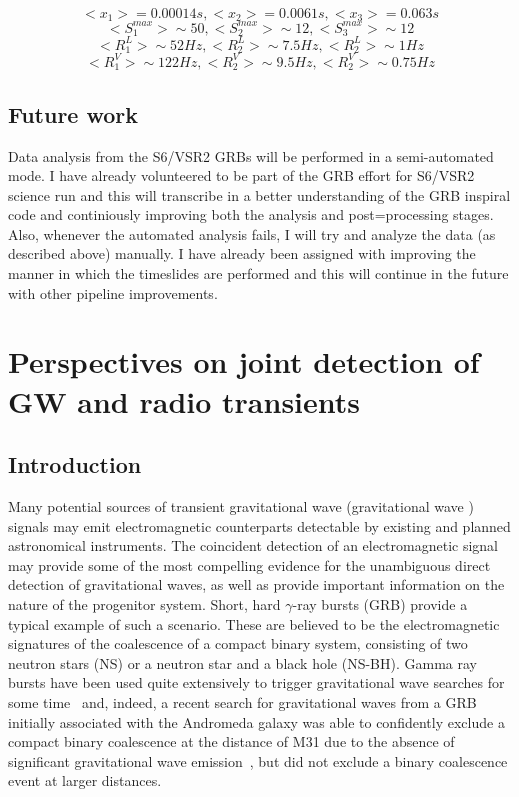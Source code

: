 \documentclass[epsf]{article}
\newcommand{\gw}{gravitational wave }
\newcommand{\gws}{gravitational waves }
\begin{document}
\begin{equation}
<x_1> = 0.00014 s, <x_2> = 0.0061 s, <x_3> = 0.063 s
\label{xs}
\end{equation}
\begin{equation}
<S^{max}_1> \sim 50, <S^{max}_2> \sim 12, <S^{max}_3> \sim 12
\end{equation}
\begin{equation}
<R^L_1> \sim 52 Hz, <R^L_2> \sim 7.5 Hz, <R^L_2> \sim 1 Hz
\end{equation}
\begin{equation}
<R^V_1> \sim 122 Hz, <R^V_2> \sim 9.5 Hz, <R^V_2> \sim 0.75 Hz
\end{equation}


\subsection{Future work}
 Data analysis from the S6/VSR2 GRBs will be performed in a semi-automated mode. I have already volunteered to be part of the GRB effort for S6/VSR2 science run and this will transcribe in a better understanding of the GRB inspiral code and continiously improving both the analysis and post=processing stages. Also, whenever the automated analysis fails, I will try and analyze the data (as described above) manually. I have already been assigned with improving the manner in which the timeslides are performed and this will continue in the future with other pipeline improvements. 


 
\section{Perspectives on joint detection of GW and radio transients}

\subsection{Introduction}

Many
potential sources of transient gravitational wave (\gw) signals may emit
electromagnetic counterparts detectable by existing and planned astronomical instruments.
The coincident detection of an electromagnetic signal may provide
some of the most compelling evidence for the unambiguous direct detection of
gravitational waves, as well as provide important information on the
nature of the progenitor system.  Short, hard $\gamma$-ray bursts (GRB) provide a typical
example of such a scenario.  These are believed to be the electromagnetic signatures of
the coalescence of a compact binary system, consisting of two neutron stars (NS) or
a neutron star and a black hole (NS-BH).  Gamma ray bursts have been used quite extensively
to trigger \gw searches for some time~\cite{Abbott:2007rh,Collaboration:2009kk,0264-9381-25-22-225001}
and, indeed, a recent search for \gws from a GRB initially associated with the Andromeda galaxy
was able to confidently exclude a compact binary coalescence at the distance of M31 due to the absence
of significant \gw emission~\cite{Abbott:2007rh}, but did not exclude a binary coalescence event at larger distances.
\end{document}
